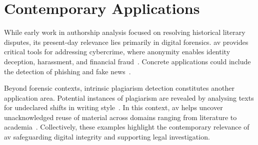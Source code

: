 \section{Contemporary Applications} %
\label{sec:digital_forensics}

While early work in authorship analysis focused on resolving historical literary disputes, its present-day relevance lies primarily in digital forensics. %
\ac{av} provides critical tools for addressing cybercrime, where anonymity enables identity deception, harassment, and financial fraud~\citep{abbasi_writeprints_2008,uchendu_authorship_2020,bhattacharjee_fighting_2024}. 
Concrete applications could include the detection of phishing and fake news~\citep{mao_raidar_2024,li_learning_2025,baradia_mirror_2025}.%

Beyond forensic contexts, intrinsic plagiarism detection constitutes another application area.
Potential instances of plagiarism are revealed by analysing texts for undeclared shifts in writing style~\citep{stein_intrinsic_2011}. 
In this context, \ac{av} helps uncover unacknowledged reuse of material across domains ranging from literature to academia~\citep{neal_surveying_2018}. 
Collectively, these examples highlight the contemporary relevance of \ac{av} safeguarding digital integrity and supporting legal investigation.
